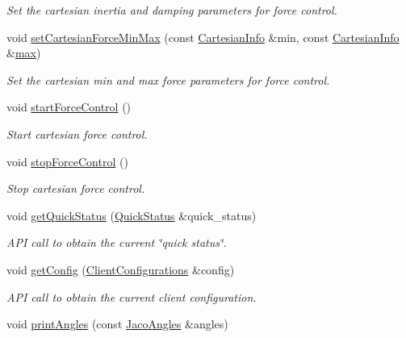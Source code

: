 \begin{DoxyCompactItemize}
\begin{DoxyCompactList}\small\item\em Set the cartesian inertia and damping parameters for force control. \end{DoxyCompactList}\item 
void \hyperlink{classjaco_1_1_jaco_comm_a39faaf774115561ea1857349db182145}{set\+Cartesian\+Force\+Min\+Max} (const \hyperlink{struct_cartesian_info}{Cartesian\+Info} \&min, const \hyperlink{struct_cartesian_info}{Cartesian\+Info} \&\hyperlink{_jaco_position_config_8dox_a55c9de72d9f3630abdf51bfe39c191dd}{max})
\begin{DoxyCompactList}\small\item\em Set the cartesian min and max force parameters for force control. \end{DoxyCompactList}\item 
void \hyperlink{classjaco_1_1_jaco_comm_a00e5493dfbdcaab6c1a9bd388d3b839d}{start\+Force\+Control} ()
\begin{DoxyCompactList}\small\item\em Start cartesian force control. \end{DoxyCompactList}\item 
void \hyperlink{classjaco_1_1_jaco_comm_a339cf31d88fdef6409340c82a35ecb53}{stop\+Force\+Control} ()
\begin{DoxyCompactList}\small\item\em Stop cartesian force control. \end{DoxyCompactList}\item 
void \hyperlink{classjaco_1_1_jaco_comm_a29384597e710d4cbb4e1f2ae6b7d7e50}{get\+Quick\+Status} (\hyperlink{struct_quick_status}{Quick\+Status} \&quick\+\_\+status)
\begin{DoxyCompactList}\small\item\em A\+PI call to obtain the current \char`\"{}quick status\char`\"{}. \end{DoxyCompactList}\item 
void \hyperlink{classjaco_1_1_jaco_comm_a47a3557e9b5576bc83df936caa043270}{get\+Config} (\hyperlink{struct_client_configurations}{Client\+Configurations} \&config)
\begin{DoxyCompactList}\small\item\em A\+PI call to obtain the current client configuration. \end{DoxyCompactList}\item 
void \hyperlink{classjaco_1_1_jaco_comm_a0524faa99cdc1361d50c3c6a53d5cfe0}{print\+Angles} (const \hyperlink{classjaco_1_1_jaco_angles}{Jaco\+Angles} \&angles)

\end{DoxyCompactItemize}

